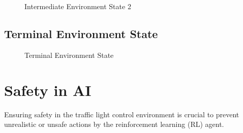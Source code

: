 \documentclass{article}
\begin{document}
  \begin{figure}[H]
    \centering
    \caption{Intermediate Environment State 2}
  \end{figure}

  \subsection{Terminal Environment State}

  \begin{figure}[H]
      \centering
      \caption{Terminal Environment State}
  \end{figure}

\section{Safety in AI}

Ensuring safety in the traffic light control environment is crucial to prevent unrealistic or unsafe actions by the reinforcement learning (RL) agent. \\
\end{document}
